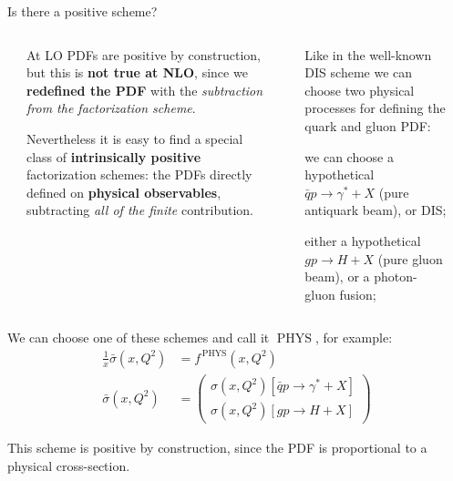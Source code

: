 \documentclass[8pt]{beamer}
\DeclareMathOperator{\phys}{PHYS}
\begin{document}
\begin{frame}{Is there a positive scheme?}
    \begin{columns}
        \begin{column}{0.00\textwidth}
        \end{column}
        \begin{column}{0.4\textwidth}
            At LO PDFs are positive by construction, but this is \textbf{not
            true at NLO}, since we \textbf{redefined the PDF} with the
            \textit{subtraction from the factorization scheme}.
            \newline

            Nevertheless it is easy to find a special class of
            \textbf{intrinsically positive} factorization schemes:
            the PDFs directly defined on \textbf{physical observables},
            subtracting \textit{all of the finite} contribution.
        \end{column}

        \begin{column}{0.05\textwidth}
        \end{column}

        \begin{column}{0.5\textwidth}
            Like in the well-known DIS scheme we can choose two physical
            processes for defining the quark and gluon PDF:
            \begin{description}[style=unboxed]
                \item[quark] we can choose a hypothetical $\bar{q} p \to
                    \gamma^* + X$ (pure antiquark beam), or DIS;
                \item[gluon] either a hypothetical $g p \to H + X$ (pure gluon
                    beam), or a photon-gluon fusion;
            \end{description}
        \end{column}
        \begin{column}{0.00\textwidth}
        \end{column}
    \end{columns}

    \vspace*{30pt}
    We can choose one of these schemes and call it $\phys$, for example:
    \begin{align*}
        \frac{1}{x}\bar{\sigma}(x,Q^2) &= f^{\,\phys}(x,Q^2)\\
        \bar{\sigma}(x,Q^2) &= \begin{pmatrix}
        \sigma(x,Q^2)[\bar{q} p \to \gamma^* + X]\\
        \sigma(x,Q^2)[g p \to H + X]
        \end{pmatrix}
    \end{align*}

    This scheme is positive by construction, since the PDF is proportional to a
    physical cross-section.
\end{frame}
\end{document}
